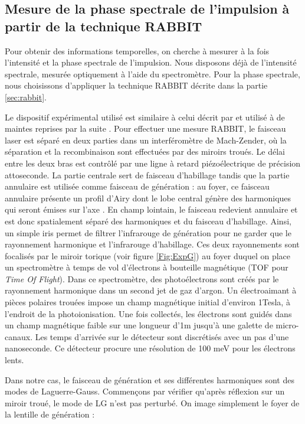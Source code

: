 \subsection{Mesure de la phase spectrale de l'impulsion à partir de la technique RABBIT}
Pour obtenir des informations temporelles, on cherche à mesurer à la fois l'intensité et la phase spectrale de l'impulsion. Nous disposons déjà de l'intensité spectrale, mesurée optiquement à l'aide du spectromètre. Pour la phase spectrale, nous choisissons d'appliquer la technique RABBIT décrite dans la partie \ref{sec:rabbit}.

Le dispositif expérimental utilisé est similaire à celui décrit par  et utilisé à de maintes reprises par la suite . Pour effectuer une mesure RABBIT, le faisceau laser est séparé en deux parties dans un interféromètre de Mach-Zender, où la séparation et la recombinaison sont effectuées par des miroirs troués. Le délai entre les deux bras est contrôlé par une ligne à retard piézoélectrique de précision attoseconde. La partie centrale sert de faisceau d'habillage tandis que la partie annulaire est utilisée comme faisceau de génération : au foyer, ce faisceau annulaire présente un profil d'Airy dont le lobe central génère des harmoniques qui seront émises sur l'axe . En champ lointain, le faisceau redevient annulaire et est donc spatialement séparé des harmoniques et du faisceau d'habillage. Ainsi, un simple iris permet de filtrer l'infrarouge de génération pour ne garder que le rayonnement harmonique et l'infrarouge d'habillage. Ces deux rayonnements sont focalisés par le miroir torique (voir figure \ref{Fig:ExpG}) au foyer duquel on place un spectromètre à temps de vol d'électrons à bouteille magnétique (TOF pour \textit{Time Of Flight}). Dans ce spectromètre, des photoélectrons sont créés par le rayonnement harmonique dans un second jet de gaz d'argon. Un électroaimant à pièces polaires trouées impose un champ magnétique initial d’environ 1Tesla, à l’endroit de la photoionisation. Une fois collectés, les électrons sont guidés dans un champ magnétique faible sur une longueur d’1m jusqu'à une galette de micro-canaux. Les temps d’arrivée sur le détecteur sont discrétisés avec un pas d’une nanoseconde. Ce détecteur procure une résolution de 100 meV pour les électrons lents. 

Dans notre cas, le faisceau de génération et ses différentes harmoniques sont des modes de Laguerre-Gauss. Commençons par vérifier qu'après réflexion sur un miroir troué, le mode de LG n'est pas perturbé. On image simplement le foyer de la lentille de génération :

